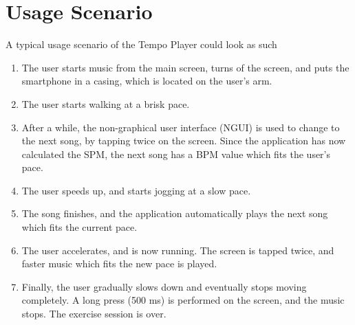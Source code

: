 \section{Usage Scenario}
A typical usage scenario of the Tempo Player could look as such

\begin{enumerate}
\item The user starts music from the main screen, turns of the screen, and puts the smartphone in a casing, which is located on the user's arm.
\item The user starts walking at a brisk pace.
\item After a while, the non-graphical user interface (NGUI) is used to change to the next song, by tapping twice on the screen.
\subitem Since the application has now calculated the SPM, the next song has a BPM value which fits the user's pace.
\item The user speeds up, and starts jogging at a slow pace.
\item The song finishes, and the application automatically plays the next song which fits the current pace.
\item The user accelerates, and is now running. The screen is tapped twice, and faster music which fits the new pace is played.
\item Finally, the user gradually slows down and eventually stops moving completely. A long press (500 ms) is performed on the screen, and the music stops. The exercise session is over.
\end{enumerate}